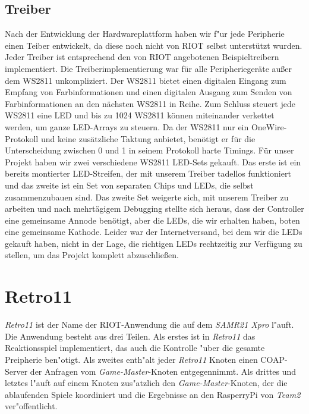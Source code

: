 \documentclass[a4paper]{article}
\begin{document}
  \subsection{Treiber}
    \label{sec:hardware_driver}
    Nach der Entwicklung der Hardwareplattform haben wir f"ur jede Peripherie
    einen Teiber entwickelt, da diese noch nicht von RIOT selbst unterstützt
    wurden. Jeder Treiber ist entsprechend den von RIOT angebotenen
    Beispieltreibern implementiert. Die Treiberimplementierung war für alle
    Peripheriegeräte außer dem WS2811 unkompliziert. Der WS2811 bietet einen
    digitalen Eingang zum Empfang von Farbinformationen und einen digitalen
    Ausgang zum Senden von Farbinformationen an den nächsten WS2811 in Reihe.
    Zum Schluss steuert jede WS2811 eine LED und bis zu 1024 WS2811 können
    miteinander verkettet werden, um ganze LED-Arrays zu steuern. Da der WS2811
    nur ein OneWire-Protokoll und keine zusätzliche Taktung anbietet, benötigt
    er für die Unterscheidung zwischen 0 und 1 in seinem Protokoll harte
    Timings. Für unser Projekt haben wir zwei verschiedene WS2811 LED-Sets
    gekauft. Das erste ist ein bereits montierter LED-Streifen, der mit unserem
    Treiber tadellos funktioniert und das zweite ist ein Set von separaten
    Chips und LEDs, die selbst zusammenzubauen sind. Das zweite Set weigerte
    sich, mit unserem Treiber zu arbeiten und nach mehrtägigem Debugging
    stellte sich heraus, dass der Controller eine gemeinsame Annode benötigt,
    aber die LEDs, die wir erhalten haben, boten eine gemeinsame Kathode.
    Leider war der Internetversand, bei dem wir die LEDs gekauft haben, nicht
    in der Lage, die richtigen LEDs rechtzeitig zur Verfügung
    zu stellen, um das Projekt komplett abzuschließen.

\section{Retro11}
  \label{sec:retro11}
  \textit{Retro11} ist der Name der RIOT-Anwendung die auf dem \textit{SAMR21
  Xpro} l"auft. Die Anwendung besteht aus drei Teilen. Als erstes ist in
  \textit{Retro11} das Reaktionsspiel implementiert, das auch die Kontrolle
  "uber die gesamte Preipherie ben"otigt. Als zweites enth"alt jeder
  \textit{Retro11} Knoten einen COAP-Server der Anfragen vom
  \textit{Game-Master}-Knoten entgegennimmt. Als drittes und letztes l"auft auf
  einem Knoten zus"atzlich den \textit{Game-Master}-Knoten, der die ablaufenden
  Spiele koordiniert und die Ergebnisse an den RasperryPi von \textit{Team2}
  ver"offentlicht.
\end{document}
